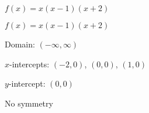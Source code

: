 {$f(x) = x(x-1)(x+2)$}
{$f(x) = x(x-1)(x+2)$

Domain: $(-\infty, \infty)$ 

$x$-intercepts: $(-2,0)$, $(0,0)$, $(1,0)$

$y$-intercept: $\left(0, 0 \right)$ 

No symmetry

\begin{center}
\end{center}
}